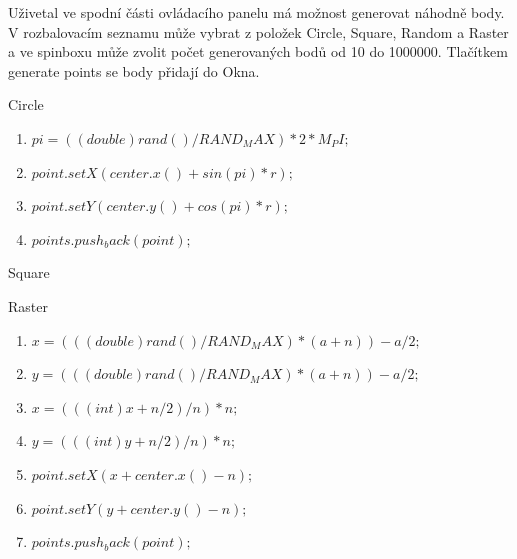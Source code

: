\documentclass[a4paper, 12pt]{article}
\begin{document}
Uživetal ve spodní části ovládacího panelu má možnost generovat náhodně body. V rozbalovacím seznamu může vybrat z položek Circle, Square, Random a Raster a ve spinboxu může zvolit počet generovaných bodů od 10 do 1000000. Tlačítkem generate points se body přidají do Okna.

Circle
\begin{enumerate}
\item $  pi = ((double)rand() / RAND_MAX) * 2 * M_PI; $
\item $              point.setX(center.x() + sin(pi) * r);$
\item $              point.setY(center.y() + cos(pi) * r);$
\item $              points.push_back(point);$
\end{enumerate}

Square

Raster
\begin{enumerate}
\item $x = (((double)rand() / RAND_MAX) * (a+n)) - a/2;$
\item $            y = (((double)rand() / RAND_MAX) * (a+n)) - a/2;$
\item $            x = (((int)x + n/2) / n) * n;$
\item $            y = (((int)y + n/2) / n) * n;$
\item $            point.setX(x + center.x() - n);$
\item $            point.setY(y + center.y() - n);$
\item $            points.push_back(point);$
\end{enumerate}
\end{document}
